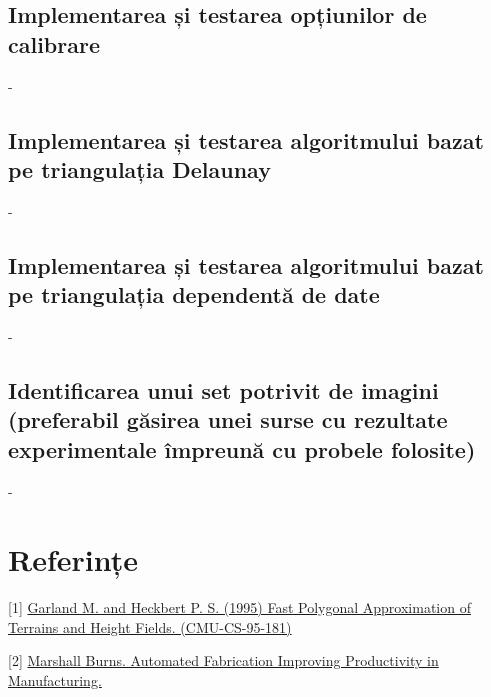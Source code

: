 \documentclass[12pt]{article}
\begin{document}
\subsection{Implementarea și testarea opțiunilor de calibrare}

-


\subsection{Implementarea și testarea algoritmului bazat pe triangulația Delaunay}

-


\subsection{Implementarea și testarea algoritmului bazat pe triangulația dependentă de date}

-


\subsection{Identificarea unui set potrivit de imagini (preferabil găsirea unei surse cu rezultate experimentale împreună cu probele folosite)}

-



\section*{Referințe}

\medskip

[1] \href{http://reports-archive.adm.cs.cmu.edu/anon/anon/home/ftp/1995/CMU-CS-95-181.pdf} {Garland M. and Heckbert P. S. (1995) Fast Polygonal Approximation of Terrains and Height Fields. (CMU-CS-95-181)}

[2] \href{https://www.fabbers.com/tech/STL_Format#Sct_binary} {Marshall Burns. Automated Fabrication
Improving Productivity in Manufacturing.}
\end{document}
